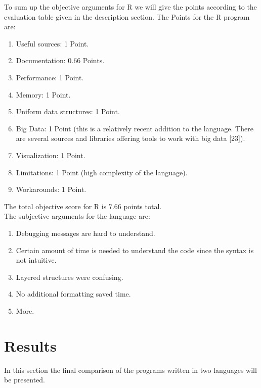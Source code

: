 \documentclass[
  twoside,
  12pt, a4paper,
  footinclude=true,
  headinclude=true,
  cleardoublepage=empty
]{article}
\begin{document}
To sum up the objective arguments for R we will give the points according to the evaluation table given in the description section. The Points for the R program are:
\begin{enumerate}
    \item Useful sources: 1 Point.
    \item Documentation: 0.66 Points.
    \item Performance: 1 Point.
    \item Memory: 1 Point.
    \item Uniform data structures: 1 Point.
    \item Big Data: 1 Point (this is a relatively recent addition to the language. There are several sources and libraries offering tools to work with big data [23]).
    \item Visualization: 1 Point.
    \item Limitations: 1 Point (high complexity of the language).
    \item Workarounds: 1 Point.
\end{enumerate} 
The total objective score for R is 7.66 points total.\\
The subjective arguments for the language are:
\begin{enumerate}
    \item Debugging messages are hard to understand.
    \item Certain amount of time is needed to understand the code since the syntax is not intuitive.
    \item Layered structures were confusing.
    \item No additional formatting saved time.
    \item More.
\end{enumerate}

\newpage
\section{Results}
In this section the final comparison of the programs written in two languages will be presented.
\end{document}
